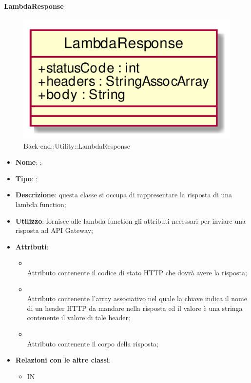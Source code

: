 \hypertarget{LambdaResponse_label}{\paragraph{LambdaResponse}}
\begin{figure}[h]
	\centering
	\includegraphics[width=\textwidth,height=\textheight,keepaspectratio]{images/ClassLambdaResponse.png}
	\caption{Back-end::Utility::LambdaResponse}
\end{figure}
\begin{itemize}
	\item \textbf{Nome}: ;
	\item \textbf{Tipo}: ;
	\item \textbf{Descrizione}: questa classe si occupa di rappresentare la risposta di una lambda function;
	\item \textbf{Utilizzo}: fornisce alle lambda function gli attributi necessari per inviare una risposta ad API Gateway;
	\item \textbf{Attributi}:
	\begin{itemize}
		\item[]  \\
		Attributo contenente il codice di stato HTTP che dovrà avere la risposta;
		\item[]  \\
		Attributo contenente l'array associativo nel quale la chiave indica il nome di un header HTTP da mandare nella risposta ed il valore è una stringa contenente il valore di tale header;
		\item[]  \\
		Attributo contenente il corpo della risposta;
	\end{itemize}
	\item \textbf{Relazioni con le altre classi}:
	\begin{itemize}
		\item IN \hyperlink{LambdaContext_label}{}
	\end{itemize}
\end{itemize}
\FloatBarrier

